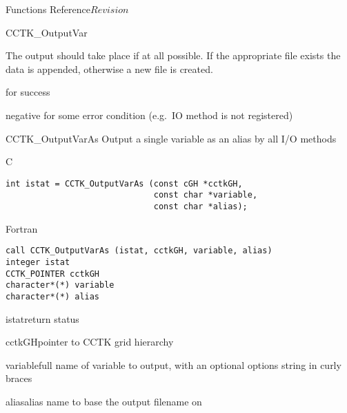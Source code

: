 \begin{cactuspart}{ Functions Reference}{}{$Revision$}
\begin{FunctionDescription}{CCTK\_OutputVar}
\begin{Discussion}
The output should take place if at all possible.
If the appropriate file exists the data is appended, otherwise a new
file is created.
\end{Discussion}

\begin{ErrorSection}
\begin{Error}{0}
for success
\end{Error}
\begin{Error}{negative}
for some error condition (e.g.\ IO method is not registered)
\end{Error}
\end{ErrorSection}
\end{FunctionDescription}


\begin{FunctionDescription}{CCTK\_OutputVarAs}
Output a single variable as an alias by all I/O methods
\label{CCTK-OutputVarAs}

\begin{SynopsisSection}
\begin{Synopsis}{C}
\begin{verbatim}
int istat = CCTK_OutputVarAs (const cGH *cctkGH,
                              const char *variable,
                              const char *alias);
\end{verbatim}
\end{Synopsis}
\begin{Synopsis}{Fortran}
\begin{verbatim}
call CCTK_OutputVarAs (istat, cctkGH, variable, alias)
integer istat
CCTK_POINTER cctkGH
character*(*) variable
character*(*) alias
\end{verbatim}
\end{Synopsis}
\end{SynopsisSection}

\begin{ParameterSection}
\begin{Parameter}{istat}return status\end{Parameter}
\begin{Parameter}{cctkGH}pointer to CCTK grid hierarchy\end{Parameter}
\begin{Parameter}{variable}full name of variable to output, with an optional
options string in curly braces\end{Parameter}
\begin{Parameter}{alias}alias name to base the output filename on\end{Parameter}
\end{ParameterSection}


\end{FunctionDescription}
\end{cactuspart}
